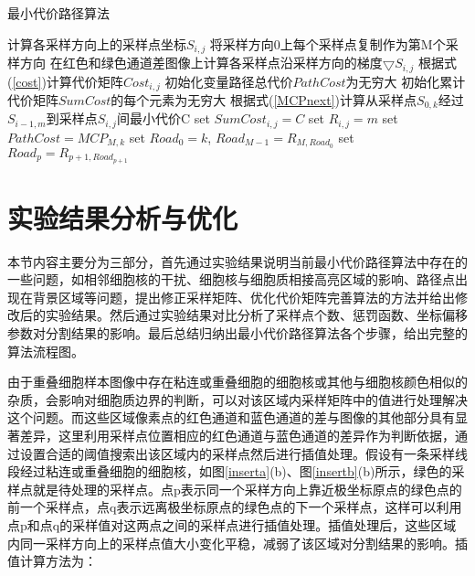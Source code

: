 \documentclass[nomlist,masters]{seuthesix}
\begin{document}
\begin{algorithm}[H]
\caption{\label{minpathalgdescp}最小代价路径算法}
\begin{algorithmic}[1]
\STATE 计算各采样方向上的采样点坐标$S_{i,j}$
\STATE 将采样方向0上每个采样点复制作为第M个采样方向
\STATE 在红色和绿色通道差图像上计算各采样点沿采样方向的梯度$\bigtriangledown S_{i,j}$
\STATE 根据式(\ref{cost})计算代价矩阵$Cost_{i,j}$
\STATE 初始化变量路径总代价$PathCost$为无穷大
\STATE 初始化累计代价矩阵$SumCost$的每个元素为无穷大
\STATE 根据式(\ref{MCPnext})计算从采样点$S_{0,k}$经过$S_{i-1,m}$到采样点$S_{i,j}$间最小代价C
\STATE set $SumCost_{i,j} = C$
\STATE set $R_{i,j} = m$
\ENDIF
\ENDFOR
\ENDFOR
\ENDFOR
{}
\STATE set $PathCost = MCP_{M,k}$
\STATE set $Road_{0} = k$, $Road_{M-1} = R_{M,Road_{0}}$
\STATE set $Road_{p} = R_{p+1,Road_{p+1}}$
\ENDFOR
\ENDIF
\ENDFOR
\end{algorithmic}
\end{algorithm}



\section{实验结果分析与优化}
本节内容主要分为三部分，首先通过实验结果说明当前最小代价路径算法中存在的一些问题，如相邻细胞核的干扰、细胞核与细胞质相接高亮区域的影响、路径点出现在背景区域等问题，提出修正采样矩阵、优化代价矩阵完善算法的方法并给出修改后的实验结果。然后通过实验结果对比分析了采样点个数、惩罚函数、坐标偏移参数对分割结果的影响。最后总结归纳出最小代价路径算法各个步骤，给出完整的算法流程图。

由于重叠细胞样本图像中存在粘连或重叠细胞的细胞核或其他与细胞核颜色相似的杂质，会影响对细胞质边界的判断，可以对该区域内采样矩阵中的值进行处理解决这个问题。而这些区域像素点的红色通道和蓝色通道的差与图像的其他部分具有显著差异，这里利用采样点位置相应的红色通道与蓝色通道的差异作为判断依据，通过设置合适的阈值搜索出该区域内的采样点然后进行插值处理。假设有一条采样线段经过粘连或重叠细胞的细胞核，如图\ref{inserta}(b)、图\ref{insertb}(b)所示，绿色的采样点就是待处理的采样点。点p表示同一个采样方向上靠近极坐标原点的绿色点的前一个采样点，点q表示远离极坐标原点的绿色点的下一个采样点，这样可以利用点p和点q的采样值对这两点之间的采样点进行插值处理。插值处理后，这些区域内同一采样方向上的采样点值大小变化平稳，减弱了该区域对分割结果的影响。插值计算方法为：
\end{document}
